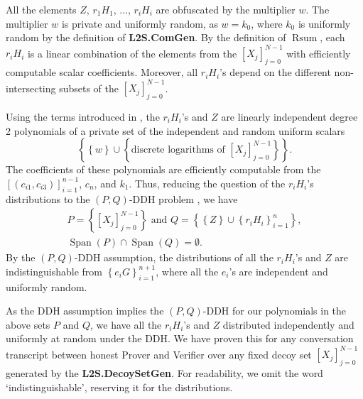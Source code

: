 \documentclass{mathcryptology} %
\DeclareMathOperator{\Rsum}{Rsum}
\DeclareMathOperator{\Span}{Span}
\theoremstyle{title}
\theoremstyle{titleof}
\begin{document}
    All the elements $Z$, $r_{1}H_{1}$, $\dots$, $r_{i}H_{i}$ are obfuscated by the multiplier $w$. The multiplier $w$ is private and uniformly random, as $w=k_{0}$, where $k_{0}$ is uniformly random by the definition of \textbf{L2S.ComGen}. By the definition of $\Rsum$, each $r_{i}H_{i}$ is a linear combination of the elements from the ${\left[X_{j}\right]}_{j=0}^{N-1}$ with efficiently computable scalar coefficients. Moreover, all $r_{i}H_{i}$'s depend on the different non-intersecting subsets of the ${\left[X_{j}\right]}_{j=0}^{N-1}$.

    Using the terms introduced in \cite{4}, the $r_{i}H_{i}$'s and $Z$ are linearly independent degree 2 polynomials of a private set of the independent and random uniform scalars
    \begin{equation*}
        \left\{\left\{w\right\} \cup \left\{\text{discrete logarithms of ${\left[X_{j}\right]}_{j=0}^{N-1}$} \right\}\right\}.
    \end{equation*}
    The coefficients of these polynomials are efficiently computable from the ${\left[\left(c_{i1}, c_{i3}\right)\right]}_{i=1}^{n-1}$, $c_{n}$, and $k_{1}$. Thus, reducing the question of the $r_{i}H_{i}$'s distributions to the $\left(P,Q\right)$-DDH problem \cite{4}, we have
    \begin{gather*}
        P = \left\{ {\left[X_{j}\right]}_{j=0}^{N-1} \right\} \text{ and }
        Q = \left\{\left\{Z\right\} \cup {\left\{r_{i}H_{i}\right\}}_{i=1}^n \right\},\\
        \Span\left(P\right) \cap \Span\left(Q\right)= \emptyset.
    \end{gather*}
    By the $\left(P,Q\right)$-DDH assumption, the distributions of all the $r_{i}H_{i}$'s and $Z$ are indistinguishable from ${\left\{e_{i} G\right\}}_{i=1}^{n+1}$, where all the $e_{i}$'s are independent and uniformly random.

    As the DDH assumption implies the $\left(P,Q\right)$-DDH \cite{4} for our polynomials in the above sets $P$ and $Q$, we have all the $r_{i}H_{i}$'s and $Z$ distributed independently and uniformly at random under the DDH. We have proven this for any conversation transcript between honest Prover and Verifier over any fixed decoy set ${\left[X_{j}\right]}_{j=0}^{N-1}$ generated by the \textbf{L2S.DecoySetGen}. For readability, we omit the word `indistinguishable', reserving it for the distributions.
\end{document}
